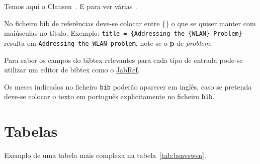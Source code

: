Temos aqui o Clausen~\cite{Clausen2003}. E para ver várias~\cite{yaacoub2012, etsitr102732, strunk2007elements}.

No ficheiro bib de referências deve-se colocar entre \{\} o que se quiser manter com maiúsculas no título. Exemplo: \texttt{title = \{Addressing the \{WLAN\} Problem\}} resulta em \texttt{Addressing the WLAN problem}, note-se o \textbf{p} de \emph{problem}. 

Para saber os campos do bibtex relevantes para cada tipo de entrada pode-se utilizar um editor de bibtex como o \href{http://www.jabref.org}{JabRef}.

Os meses indicados no ficheiro \texttt{bib} poderão aparecer em inglês, caso se pretenda deve-se colocar o texto em português explicitamente no ficheiro \texttt{bib}.

\section{Tabelas}
Exemplo de uma tabela mais complexa na tabela~\ref{tab:bsnvswsn}.

